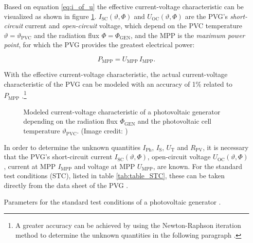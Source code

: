 Based on equation \ref{eq:i_of_u} the effective current-voltage characteristic can be visualized as shown in figure \ref{fig:tikz/tikz_PVG_curve}. $I_{\mathrm{SC}}\left(\vartheta,\Phi\right)$ and $U_{\mathrm{OC}}\left(\vartheta,\Phi\right)$ are the PVG's \emph{short-circuit} current and \emph{open-circuit} voltage, which depend on the PVC temperature $\vartheta = \vartheta_{\mathrm{PVC}}$ and the radiation flux $\Phi = \Phi_{\mathrm{GEN}}$, and the MPP is the \emph{maximum power point}, for which the PVG provides the greatest electrical power:
\begin{center}
	\begin{equation} \label{eq:p_mpp}
		P_{\mathrm{MPP}} = U_{\mathrm{MPP}} \, I_{\mathrm{MPP}} \text{.}
	\end{equation}
\end{center}
With the effective current-voltage characteristic, the actual current-voltage characteristic of the PVG can be modeled with an accuracy of 1\% related to $P_{\mathrm{MPP}}$ \cite{Prechtl:2006, Mertens:2015, Wagner:2018}.\footnote{A greater accuracy can be achieved by using the Newton-Raphson iteration method to determine the unknown quantities in the following paragraph \cite{Wagner:2018}.}
\begin{figure}[h!]
	\centering
	
	\caption{Modeled current-voltage characteristic of a photovoltaic generator depending on the radiation flux $\Phi_{\mathrm{GEN}}$ and the photovoltaic cell temperature $\vartheta_{\mathrm{PVC}}$. (Image credit: \cite{Mertens:2015, Wagner:2018})}
	\label{fig:tikz/tikz_PVG_curve}
\end{figure}

In order to determine the unknown quantities $I_{\mathrm{Ph}}$, $I_{\mathrm{S}}$, $U_{\mathrm{T}}$ and $R_{\mathrm{PV}}$, it is necessary that the PVG's short-circuit current $I_\mathrm{SC}\left(\vartheta,\Phi\right)$, open-circuit voltage $U_\mathrm{OC}\left(\vartheta,\Phi\right)$, current at MPP $I_\mathrm{MPP}$ and voltage at MPP $U_\mathrm{MPP}$, are known. For the standard test conditions (STC), listed in table \ref{tab:table_STC}, these can be taken directly from the data sheet of the PVG \cite{Mertens:2015, Wagner:2018}. 

\begin{table}[h!]
	\centering
	
	\caption{Parameters for the standard test conditions of a photovoltaic generator \cite{Mertens:2015}.}
	\label{tab:table_STC}
\end{table}

